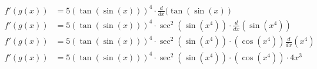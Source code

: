 \documentclass[preview]{standalone}
\begin{document}
\begin{align*}
f'(g(x))&=5(\tan(\sin(x)))^4 \cdot \frac{d}{dx}(\tan(\sin(x)) \\ f'(g(x))&=5(\tan(\sin(x)))^4 \cdot \sec^2(\sin(x^4)) \cdot \frac{d}{dx}(\sin(x^4)) \\ f'(g(x))&=5(\tan(\sin(x)))^4 \cdot \sec^2(\sin(x^4)) \cdot (\cos(x^4)) \frac{d}{dx}(x^4) \\ f'(g(x))&=5(\tan(\sin(x)))^4 \cdot \sec^2(\sin(x^4)) \cdot (\cos(x^4)) \cdot 4x^3
\end{align*}
\end{document}
